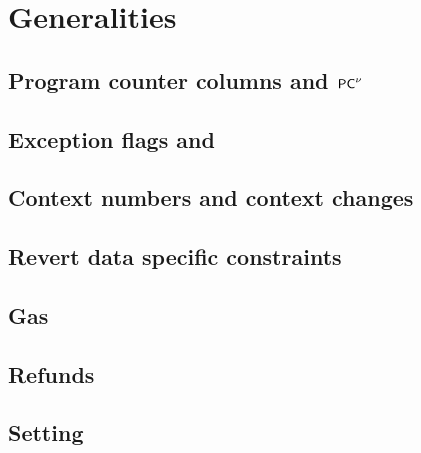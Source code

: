 
\section{Generalities}                                                                           \label{hub: generalities}
\subsection{Program counter columns \pc{} and $\textsf{PC}^{\nu}$ \lispDone{}}                             \label{hub: generalities: program counter}                                 
\subsection{Exception flags and \XAHOY{ \lispDone{}}}                                            \label{hub: generalities: exceptions}                                      
\subsection{Context numbers and context changes \lispDone{}}                                     \label{hub: generalities: context changes}                                 
\subsection{Revert data specific constraints \lispDone{}}                                        \label{hub: generalities: revert}                                          
\subsection{Gas \lispDone{}}                                                                     \label{hub: generalities: gas}                                             
\subsection{Refunds \lispDone{}}                                                                 \label{hub: generalities: refunds}                                         
\subsection{Setting \stackJUMPDESTINATIONVETTING{} \lispDone{}}                                  \label{hub: generalities: setting the jump destination vetting flag}       
